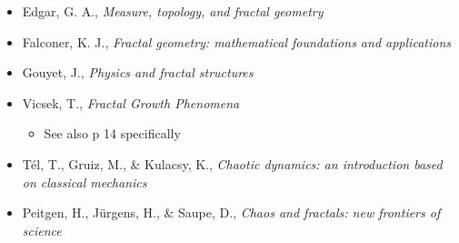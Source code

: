 \documentclass[11pt]{article}
\begin{document}
\begin{itemize}
\item Edgar, G. A., \emph{Measure, topology, and fractal geometry} \cite[Ch. 6]{edgarMeasureTopologyFractal2008a}
\item Falconer, K. J., \emph{Fractal geometry: mathematical foundations and applications}  \cite[Ch. 2]{falconerFractalGeometryMathematical2003b}
\item Gouyet, J., \emph{Physics and fractal structures} \cite[\S1.3]{gouyetPhysicsFractalStructures1996}
\item Vicsek, T., \emph{Fractal Growth Phenomena} \cite[Ch. 4]{vicsekFractalGrowthPhenomena1992}
\begin{itemize}
\item See also p 14 specifically
\end{itemize}
\item Tél, T., Gruiz, M., \& Kulacsy, K., \emph{Chaotic dynamics: an introduction based on classical mechanics}  \cite[\S2.1.2]{telChaoticDynamicsIntroduction2006}
\item Peitgen, H., Jürgens, H., \& Saupe, D., \emph{Chaos and fractals: new frontiers of science}  \cite[\S 4.3]{peitgenChaosFractalsNew2004}
\end{itemize}
\end{document}
